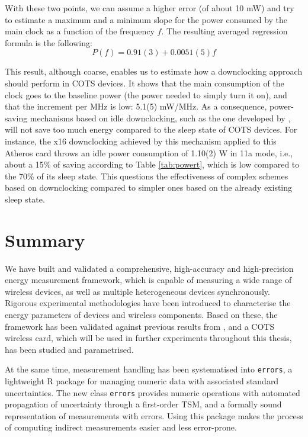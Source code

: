 \documentclass[twoside,nohyper]{tufte-book}
\theoremstyle{definition}
\theoremstyle{definition}
\theoremstyle{definition}
\theoremstyle{remark}
\begin{document}
With these two points, we can assume a higher error (of about 10 mW) and
try to estimate a maximum and a minimum slope for the power consumed by
the main clock as a function of the frequency \(f\). The resulting
averaged regression formula is the following:
%
\begin{equation}
 P(f) = 0.91(3) + 0.0051(5)f \label{eq:Pf}
\end{equation}
%


This result, although coarse, enables us to estimate how a downclocking
approach should perform in COTS devices. It shows that the main
consumption of the clock goes to the baseline power (the power needed to
simply turn it on), and that the increment per MHz is low: 5.1(5)
mW/MHz. As a consequence, power-saving mechanisms based on idle
downclocking, such as the one developed by \citet{Zhang2012}, will not
save too much energy compared to the sleep state of COTS devices. For
instance, the x16 downclocking achieved by this mechanism applied to
this Atheros card throws an idle power consumption of 1.10(2) W in 11a
mode, i.e., about a 15\% of saving according to Table \ref{tab:powert},
which is low compared to the 70\% of its sleep state. This questions the
effectiveness of complex schemes based on downclocking compared to
simpler ones based on the already existing sleep state.

\hypertarget{summary}{%
\section{Summary}\label{summary}}

We have built and validated a comprehensive, high-accuracy and
high-precision energy measurement framework, which is capable of
measuring a wide range of wireless devices, as well as multiple
heterogeneous devices synchronously. Rigorous experimental methodologies
have been introduced to characterise the energy parameters of devices
and wireless components. Based on these, the framework has been
validated against previous results from \citet{Serrano2014}, and a COTS
wireless card, which will be used in further experiments throughout this
thesis, has been studied and parametrised.

At the same time, measurement handling has been systematised into
\texttt{errors}\cite[0pt]{contrib-03},
a lightweight R package for managing numeric data with associated
standard uncertainties. The new class \texttt{errors} provides numeric
operations with automated propagation of uncertainty through a
first-order TSM, and a formally sound representation of measurements
with errors. Using this package makes the process of computing indirect
measurements easier and less error-prone.
\end{document}
